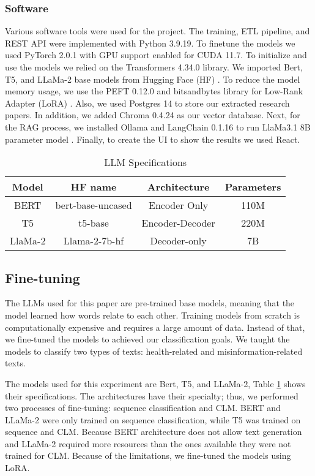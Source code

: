 \subsubsection{Software}
Various software tools were used for the project. The training, ETL pipeline, and REST API were implemented with Python 3.9.19. To finetune the models we used PyTorch 2.0.1 with GPU support enabled for
CUDA 11.7. To initialize and use the models we relied on  the Transformers 4.34.0 library. We imported Bert, T5, and LLaMa-2 base models from Hugging Face (HF) \cite{huggingface}. To reduce the model memory usage, we use the PEFT 0.12.0 and bitsandbytes library for Low-Rank Adapter (LoRA) \cite{hu2021loralowrankadaptationlarge}. Also, we used Postgres 14 to store our extracted research papers. In addition, we added Chroma 0.4.24 as our vector database. Next, for the RAG process, we installed Ollama \cite{ollama} and LangChain 0.1.16 to run LlaMa3.1 8B parameter model \cite{touvron2023llamaopenefficientfoundation}. Finally, to create the UI to show the results we used React.

  \begin{table}[ht!]
\centering
\caption{LLM Specifications}
{\scriptsize
\begin{tabular}{||c | c | c | c||} 
 \hline
\textbf{Model} & \textbf{HF name} & \textbf{Architecture} & \textbf{Parameters} \\ [0.5ex] 
 \hline
 BERT & bert-base-uncased & Encoder Only & 110M \\ 
 \hline
 T5 & t5-base & Encoder-Decoder & 220M \\
 \hline
 LlaMa-2 & Llama-2-7b-hf & Decoder-only & 7B \\
 \hline
\end{tabular}
}
\label{table:LLM}
\end{table}

\subsection{Fine-tuning}

The LLMs used for this paper are pre-trained base models, meaning that the model learned how words relate to each other. Training models from scratch is computationally expensive and requires a large amount of data. Instead of that, we fine-tuned the models to achieved our classification goals. We taught the models to classify two types of texts: health-related and misinformation-related texts. 

The models used for this experiment are Bert, T5, and LLaMa-2, Table \ref{table:LLM} shows their specifications. The architectures have their specialty; thus, we performed two processes of fine-tuning: sequence classification and CLM. BERT and LLaMa-2 were only trained on sequence classification, while T5 was trained on sequence and CLM. Because BERT architecture does not allow text generation and LLaMa-2 required more resources than the ones available they were not trained for CLM. Because of the limitations, we fine-tuned the models using LoRA. 

